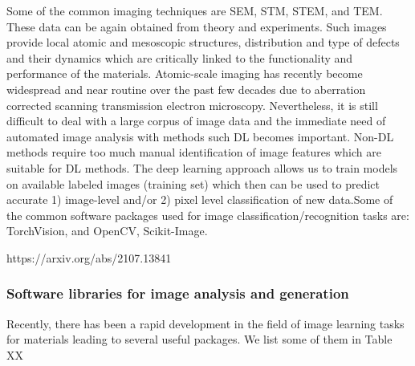 \documentclass[pdflatex,sn-mathphys]{sn-jnl}%
\theoremstyle{thmstyleone}%
\theoremstyle{thmstyletwo}%
\theoremstyle{thmstylethree}%
\begin{document}
Some of the common imaging techniques are SEM, STM, STEM, and TEM. These data can be again obtained from theory and experiments. Such images provide  local atomic and mesoscopic structures, distribution and type of defects and their dynamics which are critically linked to the functionality and performance of the materials. Atomic-scale imaging has recently become widespread and near routine over the past few decades  due to aberration corrected scanning transmission electron microscopy. Nevertheless, it is still difficult to deal with a large corpus of image data and the immediate need of automated image analysis with methods such DL becomes important. Non-DL methods require too much manual identification of image features which are suitable for DL methods. The deep learning approach allows us to train models on available labeled images (training set) which then can be used to predict accurate 1) image-level and/or 2) pixel level classification of new data.Some of the common software packages used for image classification/recognition tasks are: TorchVision, and OpenCV, Scikit-Image.

https://arxiv.org/abs/2107.13841

\subsubsection{Software libraries for image analysis and generation}
Recently, there has been a rapid development in the field of image learning tasks for materials leading to several useful packages. We list some of them in Table XX
\end{document}
